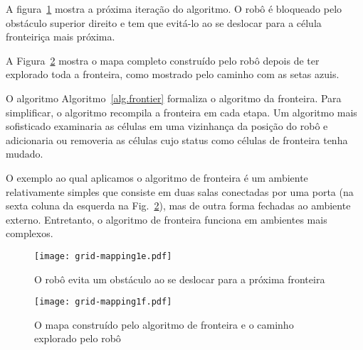 A figura~\ref{fig.map-explore4} mostra a próxima iteração do algoritmo. O robô é bloqueado pelo obstáculo superior direito e tem que evitá-lo ao se deslocar para a célula fronteiriça mais próxima.

A Figura~\ref{fig.map-explore5} mostra o mapa completo construído pelo robô depois de ter explorado toda a fronteira, como mostrado pelo caminho com as setas azuis. 

O algoritmo Algoritmo~\ref{alg.frontier} formaliza o algoritmo da fronteira. Para simplificar, o algoritmo recompila a fronteira em cada etapa. Um algoritmo mais sofisticado examinaria as células em uma vizinhança da posição do robô e adicionaria ou removeria as células cujo status como células de fronteira tenha mudado.

O exemplo ao qual aplicamos o algoritmo de fronteira é um ambiente relativamente simples que consiste em duas salas conectadas por uma porta (na sexta coluna da esquerda na Fig.~\ref{fig.map-explore5}), mas de outra forma fechadas ao ambiente externo. Entretanto, o algoritmo de fronteira funciona em ambientes mais complexos. 

\begin{figure}
\begin{center}
\texttt{[image: grid-mapping1e.pdf]}
\end{center}
\caption{O robô evita um obstáculo ao se deslocar para a próxima fronteira}\label{fig.map-explore4}
\end{figure}

\begin{figure}
\begin{center}
\texttt{[image: grid-mapping1f.pdf]}
\end{center}
\caption{O mapa construído pelo algoritmo de fronteira e o caminho explorado pelo robô}\label{fig.map-explore5}
\end{figure}


